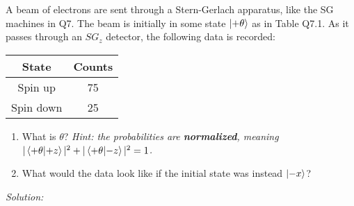 \documentclass{article}
\begin{document}
\begin{tcolorbox}[colframe=blue!50!black, arc=2mm, title=\textsc{Practice 2}]
    A beam of electrons are sent through a Stern-Gerlach apparatus, like the SG machines in Q7. The beam is initially in some state $\ket{+\theta}$ as in Table Q7.1. As it passes through an $SG_z$ detector, the following data is recorded:
    \begin{center}
    \begin{tabular}{|c|c|}
    \hline
    \textbf{State} & \textbf{Counts} \\
    \hline
    Spin up & 75 \\
    Spin down & 25 \\
    \hline
    \end{tabular}
    \end{center}
    \begin{enumerate}[label=\alph*)]
        \item What is $\theta$? \textit{Hint: the probabilities are \textbf{normalized}, meaning $|\braket{+\theta}{+z}|^2 + |\braket{+\theta}{-z}|^2 =1$.}
        \item What would the data look like if the initial state was instead $\ket{-x}$?
    \end{enumerate}
\end{tcolorbox}

\textit{Solution:}

\vspace{1em}
\end{document}
